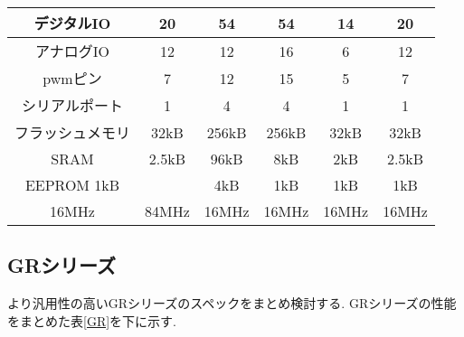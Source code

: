 \documentclass[twocolumn,11pt]{abst}
\begin{document}
\begin{table}[htb]
\begin{center}
{\begin{tabular}[htbp]{|c|c|c|c|c|c|}
  \hline 
  デジタルIO & 20 & 54 & 54 & 14 & 20 \\
  \hline 
  アナログIO & 12 & 12 & 16 & 6 & 12 \\
  \hline
  pwmピン & 7 & 12 & 15 & 5 & 7  \\
  \hline
  シリアルポート & 1 & 4 & 4 & 1 & 1  \\
  \hline 
  フラッシュメモリ & 32kB & 256kB & 256kB & 32kB & 32kB  \\
  \hline
  SRAM & 2.5kB & 96kB & 8kB & 2kB & 2.5kB  \\
  \hline
  EEPROM 1kB & & 4kB & 1kB & 1kB & 1kB \\
  \hline
  16MHz & 84MHz & 16MHz & 16MHz & 16MHz & 16MHz \\
  \hline
  \end{tabular}
  }
    \label{arduino}
 \end{center}
\end{table}


\subsection{GRシリーズ}
より汎用性の高いGRシリーズのスペックをまとめ検討する.
GRシリーズの性能をまとめた表\ref{GR}を下に示す.
\begin{table}[htb]
 \begin{center}
  \caption{GRスペック一覧}
    \label{GR}
 \end{center}
\end{table}
\end{document}
